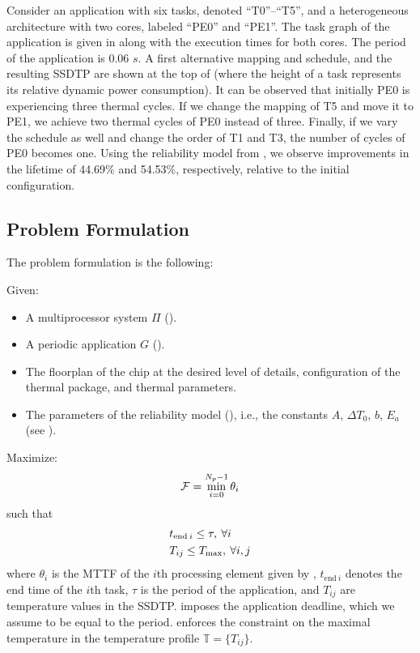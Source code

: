 Consider an application with six tasks, denoted ``T0''--``T5'', and a
heterogeneous architecture with two cores, labeled ``PE0'' and ``PE1''. The task
graph of the application is given in  along with the execution
times for both cores. The period of the application is 0.06 $s$. A first
alternative mapping and schedule, and the resulting SSDTP are shown at the top
of  (where the height of a task represents its relative dynamic
power consumption). It can be observed that initially PE0 is experiencing three
thermal cycles. If we change the mapping of T5 and move it to PE1, we achieve
two thermal cycles of PE0 instead of three. Finally, if we vary the schedule as
well and change the order of T1 and T3, the number of cycles of PE0 becomes one.
Using the reliability model from , we observe
improvements in the lifetime of 44.69\% and 54.53\%, respectively, relative to
the initial configuration.

\subsection{Problem Formulation}

The problem formulation is the following:

Given:
\begin{itemize}

\item A multiprocessor system $\Pi$ ().

\item A periodic application $G$ ().

\item The floorplan of the chip at the desired level of details, configuration
of the thermal package, and thermal parameters.

\item The parameters of the reliability model (), i.e.,
the constants $A$, $\Delta T_0$, $b$, $E_a$ (see ).

\end{itemize}

Maximize:
\begin{equation} \elab{fitness-function}
  \mathcal{F} = \min_{i = 0}^{N_p - 1} \theta_i
\end{equation}
such that
\begin{align}
  & t_{\text{end} \: i} \leq \tau, \: \forall i \elab{deadline} \\
  & T_{ij} \leq T_\text{max}, \: \forall i, j \elab{t-max}
\end{align}
where $\theta_i$ is the MTTF of the $i$th processing element given by
, $t_{\text{end} \: i}$ denotes the end time of the $i$th task,
$\tau$ is the period of the application, and $T_{ij}$ are temperature values in
the SSDTP.  imposes the application deadline, which we assume to
be equal to the period.  enforces the constraint on the maximal
temperature in the temperature profile $\mathbb{T} = \{ T_{ij} \}$.

